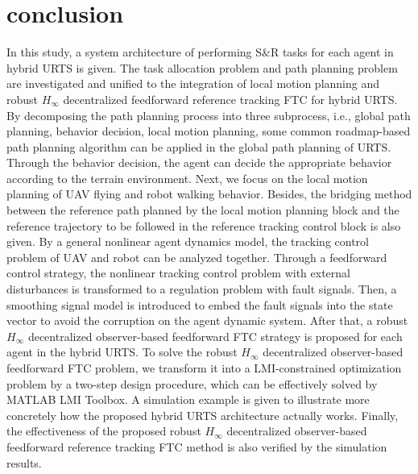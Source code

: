 \documentclass[journal,12pt,onecolumn,draftclsnofoot,]{IEEEtran}
\begin{document}
\section{conclusion}
In this study, a system architecture of performing S\&R tasks for each agent in hybrid URTS is given. The task allocation problem and path planning problem are investigated and unified to the integration of local motion planning and robust $H_\infty$ decentralized feedforward reference tracking FTC for hybrid URTS. By decomposing the path planning process into three subprocess, i.e., global path planning, behavior decision, local motion planning, some common roadmap-based path planning algorithm can be applied in the global path planning of URTS. Through the behavior decision, the agent can decide the appropriate behavior according to the terrain environment. Next, we focus on the local motion planning of UAV flying and robot walking behavior. Besides, the bridging method between the reference path planned by the local motion planning block and the reference trajectory to be followed in the reference tracking control block is also given. By a general nonlinear agent dynamics model, the tracking control problem of UAV and robot can be analyzed together. Through a feedforward control strategy, the nonlinear tracking control problem with external disturbances is transformed to a regulation problem with fault signals. Then, a smoothing signal model is introduced to embed the fault signals into the state vector to avoid the corruption on the agent dynamic system. After that, a robust $H_\infty$ decentralized observer-based feedforward FTC strategy is proposed for each agent in the hybrid URTS. To solve the robust $H_\infty$ decentralized observer-based feedforward FTC problem, we transform it into a LMI-constrained optimization problem by a two-step design procedure, which can be effectively solved by MATLAB LMI Toolbox. A simulation example is given to illustrate more concretely how the proposed hybrid URTS architecture actually works. Finally, the effectiveness of the proposed robust $H_\infty$ decentralized observer-based feedforward reference tracking FTC method is also verified by the simulation results.



\end{document}
